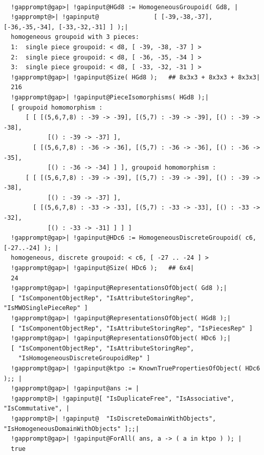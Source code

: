 \documentclass[a4paper,11pt]{report}
\begin{document}
{{{ }

 
\begin{Verbatim}[commandchars=!@|,fontsize=\small,frame=single,label=Example]
  
  !gapprompt@gap>| !gapinput@HGd8 := HomogeneousGroupoid( Gd8, |
  !gapprompt@>| !gapinput@               [ [-39,-38,-37], [-36,-35,-34], [-33,-32,-31] ] );|
  homogeneous groupoid with 3 pieces:
  1:  single piece groupoid: < d8, [ -39, -38, -37 ] >
  2:  single piece groupoid: < d8, [ -36, -35, -34 ] >
  3:  single piece groupoid: < d8, [ -33, -32, -31 ] >
  !gapprompt@gap>| !gapinput@Size( HGd8 );   ## 8x3x3 + 8x3x3 + 8x3x3|
  216
  !gapprompt@gap>| !gapinput@PieceIsomorphisms( HGd8 );|
  [ groupoid homomorphism : 
      [ [ [(5,6,7,8) : -39 -> -39], [(5,7) : -39 -> -39], [() : -39 -> -38], 
            [() : -39 -> -37] ], 
        [ [(5,6,7,8) : -36 -> -36], [(5,7) : -36 -> -36], [() : -36 -> -35], 
            [() : -36 -> -34] ] ], groupoid homomorphism : 
      [ [ [(5,6,7,8) : -39 -> -39], [(5,7) : -39 -> -39], [() : -39 -> -38], 
            [() : -39 -> -37] ], 
        [ [(5,6,7,8) : -33 -> -33], [(5,7) : -33 -> -33], [() : -33 -> -32], 
            [() : -33 -> -31] ] ] ]
  !gapprompt@gap>| !gapinput@HDc6 := HomogeneousDiscreteGroupoid( c6, [-27..-24] ); |
  homogeneous, discrete groupoid: < c6, [ -27 .. -24 ] >
  !gapprompt@gap>| !gapinput@Size( HDc6 );   ## 6x4|
  24
  !gapprompt@gap>| !gapinput@RepresentationsOfObject( Gd8 );|
  [ "IsComponentObjectRep", "IsAttributeStoringRep", "IsMWOSinglePieceRep" ]
  !gapprompt@gap>| !gapinput@RepresentationsOfObject( HGd8 );|
  [ "IsComponentObjectRep", "IsAttributeStoringRep", "IsPiecesRep" ]
  !gapprompt@gap>| !gapinput@RepresentationsOfObject( HDc6 );|
  [ "IsComponentObjectRep", "IsAttributeStoringRep", 
    "IsHomogeneousDiscreteGroupoidRep" ]
  !gapprompt@gap>| !gapinput@ktpo := KnownTruePropertiesOfObject( HDc6 );; |
  !gapprompt@gap>| !gapinput@ans := |
  !gapprompt@>| !gapinput@[ "IsDuplicateFree", "IsAssociative", "IsCommutative", |
  !gapprompt@>| !gapinput@  "IsDiscreteDomainWithObjects", "IsHomogeneousDomainWithObjects" ];;|
  !gapprompt@gap>| !gapinput@ForAll( ans, a -> ( a in ktpo ) ); |
  true
  
\end{Verbatim}
 

}}
\end{document}
